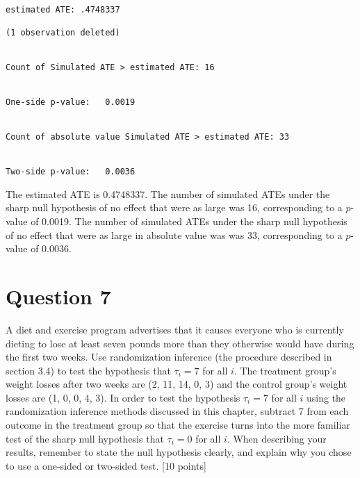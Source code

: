\documentclass[11pt,notitlepage]{article}\usepackage[]{graphicx}\usepackage[]{color}
\makeatletter
\newenvironment{kframe}{%
 \def\at@end@of@kframe{}%
 \ifinner\ifhmode%
  \def\at@end@of@kframe{\end{minipage}}%
  \begin{minipage}{\columnwidth}%
 \fi\fi%
 \def\FrameCommand##1{\hskip\@totalleftmargin \hskip-\fboxsep
 \colorbox{shadecolor}{##1}\hskip-\fboxsep
     \hskip-\linewidth \hskip-\@totalleftmargin \hskip\columnwidth}%
 \MakeFramed {\advance\hsize-\width
   \@totalleftmargin\z@ \linewidth\hsize
   \@setminipage}}%
 {\par\unskip\endMakeFramed%
 \at@end@of@kframe}
\newenvironment{knitrout}{}{} %
\makeatother
\begin{document}
\begin{knitrout}
\begin{kframe}
    \begin{Verbatim}[commandchars=\\\{\}]



estimated ATE: .4748337

(1 observation deleted)


Count of Simulated ATE > estimated ATE: 16


One-side p-value:   0.0019


Count of absolute value Simulated ATE > estimated ATE: 33


Two-side p-value:   0.0036

    \end{Verbatim}

\end{kframe}
\end{knitrout}

The estimated ATE is 0.4748337.  The number of simulated ATEs under the sharp null hypothesis of no effect that were as large was 16, corresponding to a $p$-value of 0.0019.  The number of simulated ATEs under the sharp null hypothesis of no effect that were as large in absolute value was  was 33, corresponding to a $p$-value of 0.0036.

\section*{Question 7}
A diet and exercise program advertises that it causes everyone who is currently dieting to lose at least seven pounds more than they otherwise would have during the first two weeks.  Use randomization inference (the procedure described in section 3.4) to test the hypothesis that $\tau_i=7$ for all $i$.  The treatment group's weight losses after two weeks are (2, 11, 14, 0, 3) and the control group's weight losses are (1, 0, 0, 4, 3).  In order to test the hypothesis $\tau_i=7$ for all $i$ using the randomization inference methods discussed in this chapter, subtract 7 from each outcome in the treatment group so that the exercise turns into the more familiar test of the sharp null hypothesis that $\tau_i=0$ for all $i$. When describing your results, remember to state the null hypothesis clearly, and explain why you chose to use a one-sided or two-sided test. [10 points]
\end{document}
